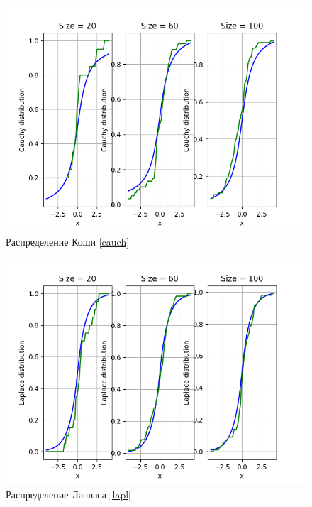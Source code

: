 \documentclass[a4paper]{article}
\begin{document}
        \begin{figure}[H]
            \centering
            \includegraphics[scale = 0.4]{cauchy_distrib.png}
            \caption{Распределение Коши \eqref{cauch}}
            \label{fig:cauchy}
        \end{figure}
        
        \begin{figure}[H]
            \centering
            \includegraphics[scale = 0.4]{laplace_distrib.png}
            \caption{Распределение Лапласа \eqref{lapl}}
            \label{fig:laplace}
        \end{figure}
        
\end{document}

